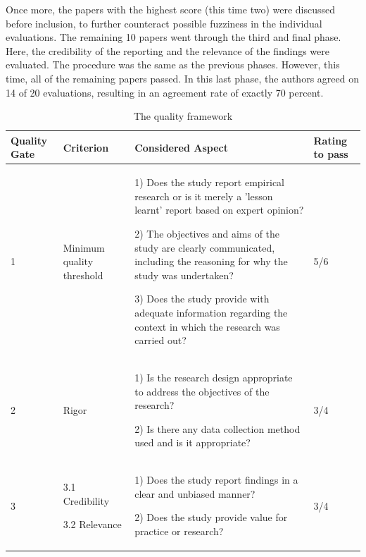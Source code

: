 \documentclass[conference]{IEEEtran}
\begin{document}
Once more, the papers with the highest score (this time two) were discussed before inclusion, to further counteract possible fuzziness in the individual evaluations.  The remaining 10 papers went through the third and final phase. Here, the credibility of the reporting and the relevance of the findings were evaluated. The procedure was the same as the previous phases. However, this time, all of the remaining papers passed. In this last phase, the authors agreed on 14 of 20 evaluations, resulting in an agreement rate of exactly 70 percent. 

\begin{table}[h]
    \renewcommand{\arraystretch}{1.5}
    \caption[]{The quality framework}
    \begin{tabular}{|p{0.7cm}|p{2cm}|p{3cm}|p{1.5cm}|}
        \hline
        Quality Gate & Criterion & Considered Aspect & Rating to pass \\ 

        \hline

        1 & Minimum quality threshold & 
        
        1) Does the study report empirical research or is it merely a 'lesson learnt' report based on expert opinion?

        2) The objectives and aims of the study are clearly communicated, including the reasoning for why the study was undertaken?

        3) Does the study provide with adequate information regarding the context in which the research was carried out?
        & 5/6 \\ 
        \hline
        2 & Rigor & 
        
        1) Is the research design appropriate to address the objectives of the research?

        2) Is there any data collection method used and is it appropriate?
        & 3/4 \\ 
        \hline  
        3 &
        3.1 Credibility 

        3.2 Relevance 
        & 
        1) Does the study report findings in a clear and unbiased manner?

        2) Does the study provide value for practice or research?
        & 
        3/4 \\ 
        \hline   
    \end{tabular}
    \label{qualityFramework}
\end{table}
\end{document}
